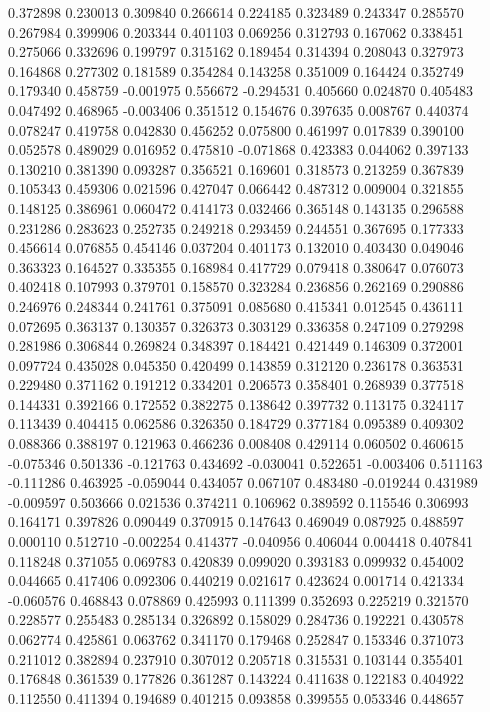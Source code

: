 0.372898
0.230013
0.309840
0.266614
0.224185
0.323489
0.243347
0.285570
0.267984
0.399906
0.203344
0.401103
0.069256
0.312793
0.167062
0.338451
0.275066
0.332696
0.199797
0.315162
0.189454
0.314394
0.208043
0.327973
0.164868
0.277302
0.181589
0.354284
0.143258
0.351009
0.164424
0.352749
0.179340
0.458759
-0.001975
0.556672
-0.294531
0.405660
0.024870
0.405483
0.047492
0.468965
-0.003406
0.351512
0.154676
0.397635
0.008767
0.440374
0.078247
0.419758
0.042830
0.456252
0.075800
0.461997
0.017839
0.390100
0.052578
0.489029
0.016952
0.475810
-0.071868
0.423383
0.044062
0.397133
0.130210
0.381390
0.093287
0.356521
0.169601
0.318573
0.213259
0.367839
0.105343
0.459306
0.021596
0.427047
0.066442
0.487312
0.009004
0.321855
0.148125
0.386961
0.060472
0.414173
0.032466
0.365148
0.143135
0.296588
0.231286
0.283623
0.252735
0.249218
0.293459
0.244551
0.367695
0.177333
0.456614
0.076855
0.454146
0.037204
0.401173
0.132010
0.403430
0.049046
0.363323
0.164527
0.335355
0.168984
0.417729
0.079418
0.380647
0.076073
0.402418
0.107993
0.379701
0.158570
0.323284
0.236856
0.262169
0.290886
0.246976
0.248344
0.241761
0.375091
0.085680
0.415341
0.012545
0.436111
0.072695
0.363137
0.130357
0.326373
0.303129
0.336358
0.247109
0.279298
0.281986
0.306844
0.269824
0.348397
0.184421
0.421449
0.146309
0.372001
0.097724
0.435028
0.045350
0.420499
0.143859
0.312120
0.236178
0.363531
0.229480
0.371162
0.191212
0.334201
0.206573
0.358401
0.268939
0.377518
0.144331
0.392166
0.172552
0.382275
0.138642
0.397732
0.113175
0.324117
0.113439
0.404415
0.062586
0.326350
0.184729
0.377184
0.095389
0.409302
0.088366
0.388197
0.121963
0.466236
0.008408
0.429114
0.060502
0.460615
-0.075346
0.501336
-0.121763
0.434692
-0.030041
0.522651
-0.003406
0.511163
-0.111286
0.463925
-0.059044
0.434057
0.067107
0.483480
-0.019244
0.431989
-0.009597
0.503666
0.021536
0.374211
0.106962
0.389592
0.115546
0.306993
0.164171
0.397826
0.090449
0.370915
0.147643
0.469049
0.087925
0.488597
0.000110
0.512710
-0.002254
0.414377
-0.040956
0.406044
0.004418
0.407841
0.118248
0.371055
0.069783
0.420839
0.099020
0.393183
0.099932
0.454002
0.044665
0.417406
0.092306
0.440219
0.021617
0.423624
0.001714
0.421334
-0.060576
0.468843
0.078869
0.425993
0.111399
0.352693
0.225219
0.321570
0.228577
0.255483
0.285134
0.326892
0.158029
0.284736
0.192221
0.430578
0.062774
0.425861
0.063762
0.341170
0.179468
0.252847
0.153346
0.371073
0.211012
0.382894
0.237910
0.307012
0.205718
0.315531
0.103144
0.355401
0.176848
0.361539
0.177826
0.361287
0.143224
0.411638
0.122183
0.404922
0.112550
0.411394
0.194689
0.401215
0.093858
0.399555
0.053346
0.448657
